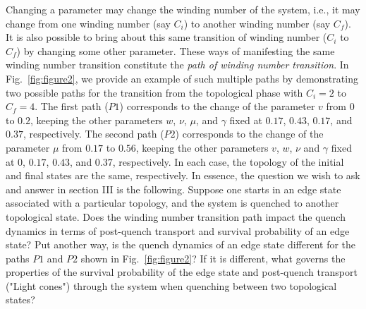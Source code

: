 \documentclass[aps,pra,reprint,superscriptaddress,longbibliography]{revtex4-2}
\begin{document}
Changing a parameter may change the winding number of the system, i.e., it may change from one winding number (say $C_i$) to another winding number (say $C_f$). It is also possible to bring about this same transition of winding number ($C_i$ to $C_f$) by changing some other parameter. These ways of manifesting the same winding number transition constitute the {\it path of winding number transition}. In Fig.~\ref{fig:figure2}, we provide an example of such multiple paths by demonstrating two possible paths for the transition from the topological phase with  $C_i=2$ to $C_f=4$. The first path ($P1$) corresponds to the change of the parameter $v$ from $0$ to $0.2$, keeping the other parameters $w$, $\nu$, $\mu$, and $\gamma$ fixed at $0.17$, $0.43$, $0.17$, and $0.37$, respectively. The second path ($P2$) corresponds to the change of the parameter $\mu$ from $0.17$ to $0.56$, keeping the other parameters $v$, $w$, $\nu$ and $\gamma$ fixed at $0$, $0.17$, $0.43$, and $0.37$, respectively. In each case, the topology of the initial and final states are the same, respectively. In essence, the question we wish to ask and answer in section III is the following. Suppose one starts in an edge state associated with a particular topology, and the system is quenched to another topological state. Does the winding number transition path impact the quench dynamics in terms of post-quench transport and survival probability of an edge state? Put another way, is the quench dynamics of an edge state different for the paths $P1$ and $P2$ shown in Fig.~\ref{fig:figure2}? If it is different, what governs the properties of the survival probability of the edge state and post-quench transport ("Light cones") through the system when quenching between two topological states?
 
\end{document}
